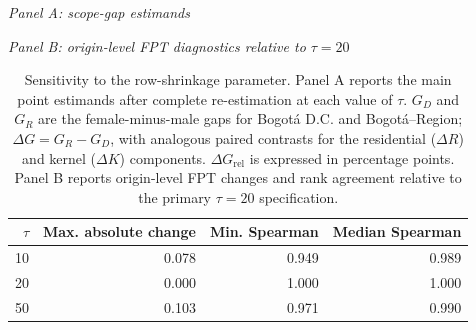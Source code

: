 \begin{table}[ht]
\centering
\caption{Sensitivity to the row-shrinkage parameter. Panel A reports the main point estimands after complete re-estimation at each value of $\tau$. $G_D$ and $G_R$ are the female-minus-male gaps for Bogotá D.C. and Bogotá--Region; $\Delta G=G_R-G_D$, with analogous paired contrasts for the residential ($\Delta R$) and kernel ($\Delta K$) components. $\Delta G_{\mathrm{rel}}$ is expressed in percentage points. Panel B reports origin-level FPT changes and rank agreement relative to the primary $\tau=20$ specification.}
\label{tab:s1_tau}

\textit{Panel A: scope-gap estimands}\\[2pt]

\vspace{0.8em}
\textit{Panel B: origin-level FPT diagnostics relative to $\tau=20$}\\[2pt]
\begin{tabular}{rrrr}
\toprule
$\tau$ & Max. absolute change & Min. Spearman & Median Spearman \\
\midrule
10 & 0.078 & 0.949 & 0.989 \\
20 & 0.000 & 1.000 & 1.000 \\
50 & 0.103 & 0.971 & 0.990 \\
\bottomrule
\end{tabular}
\end{table}
